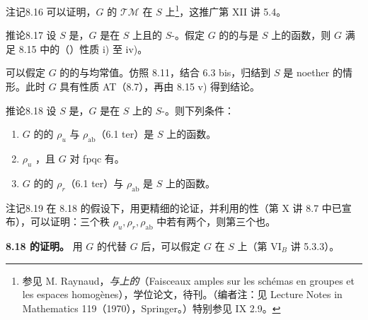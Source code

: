 \begin{SGAresult}{注记}{8.16}
可以证明，$G$ 的 $\mathcal{TM}$ 在 $S$ 上\footnote{参见 M. Raynaud，\emph{与上的}（Faisceaux amples sur les schémas en groupes et les espaces homogènes），学位论文，待刊。（编者注：见 Lecture Notes in Mathematics 119（1970），Springer。）特别参见 IX 2.9。}，这推广第 XII 讲 5.4。
\end{SGAresult}
\begin{SGAresult}{推论}{8.17}
设 $S$ 是，$G$ 是在 $S$ 上且的 $S$-。假定 $G$ 的的与是 $S$ 上的函数，则 $G$ 满足 8.15 中的（）性质 i) 至 iv)。
\end{SGAresult}
可以假定 $G$ 的的与均常值。仿照 8.11，结合 6.3 bis，归结到 $S$ 是 noether 的情形。此时 $G$ 具有性质 AT（8.7），再由 8.15 v) 得到结论。
\begin{SGAresult}{推论}{8.18}
设 $S$ 是，$G$ 是在 $S$ 上的 $S$-。则下列条件：
\begin{enumerate}
\item[a)] $G$ 的的 $\rho_u$ 与 $\rho_{\mathrm{ab}}$（6.1 ter）是 $S$ 上的函数。
\item[b)]  $\rho_u$ ，且 $G$ 对 fpqc 有。
\item[c)] $G$ 的的 $\rho_r$（6.1 ter）与 $\rho_{\mathrm{ab}}$ 是 $S$ 上的函数。
\end{enumerate}
\end{SGAresult}
\begin{SGAresult}{注记}{8.19}
在 8.18 的假设下，用更精细的论证，并利用的性（第 X 讲 8.7 中已宣布），可以证明：三个秩 $\rho_u,\rho_r,\rho_{\mathrm{ab}}$ 中若有两个，则第三个也。
\end{SGAresult}
\textbf{8.18 的证明。} 用 $G$ 的代替 $G$ 后，可以假定 $G$ 在 $S$ 上（第 VI$_B$ 讲 5.3.3）。

